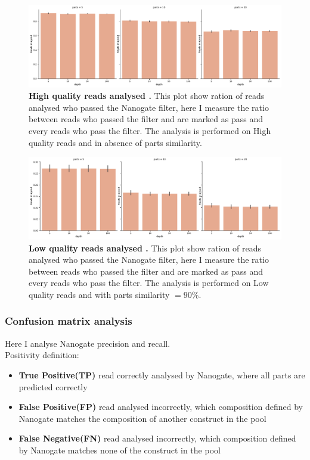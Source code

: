 \documentclass[11pt, a4paper]{article}
\begin{document}
 \begin{figure}[ht]
    \begin{center}
    \includegraphics[width=1.35\textwidth]{../results/images_notebook/v_460/hq_sim_00_good_reads_ratio.pdf}
    \end{center}
    \caption{{\bf High quality reads analysed .}  This plot show ration of reads analysed who passed the Nanogate filter, here I measure the ratio between reads who passed the filter and are marked as pass and every reads who pass the filter. The analysis is performed on High quality reads and in absence of parts similarity.}
   \label{fig:v_460_sim_00_hq_reads_quality}
\end{figure}

 \begin{figure}[ht]
    \begin{center}
    \includegraphics[width=1.35\textwidth]{../results/images_notebook/v_460/lq_sim_90_good_reads_ratio.pdf}
    \end{center}
    \caption{{\bf Low quality reads analysed .}  This plot show ration of reads analysed who passed the Nanogate filter, here I measure the ratio between reads who passed the filter and are marked as pass and every reads who pass the filter. The analysis is performed on Low quality reads and with parts similarity $= 90\%$.}
   \label{fig:v_460_sim_90_reads_quality}
\end{figure}
\clearpage
\subsubsection{Confusion matrix analysis}
Here I analyse Nanogate precision and recall. \\
Positivity definition:
\begin{itemize}
    \item \textbf{True Positive(TP)} read correctly analysed by Nanogate, where all parts are predicted correctly
      \item \textbf{False Positive(FP)} read analysed incorrectly, which composition defined by Nanogate matches the composition of another construct in the pool
    \item \textbf{False Negative(FN)} read analysed incorrectly, which composition defined by Nanogate matches none of the construct in the pool
\end{itemize}
\end{document}

